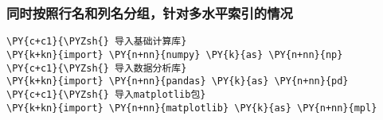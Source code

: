     \hypertarget{ux540cux65f6ux6309ux7167ux884cux540dux548cux5217ux540dux5206ux7ec4ux9488ux5bf9ux591aux6c34ux5e73ux7d22ux5f15ux7684ux60c5ux51b5}{%
\subsubsection{同时按照行名和列名分组，针对多水平索引的情况}\label{ux540cux65f6ux6309ux7167ux884cux540dux548cux5217ux540dux5206ux7ec4ux9488ux5bf9ux591aux6c34ux5e73ux7d22ux5f15ux7684ux60c5ux51b5}}

    \begin{tcolorbox}[breakable, size=fbox, boxrule=1pt, pad at break*=1mm,colback=cellbackground, colframe=cellborder]
\begin{Verbatim}[commandchars=\\\{\}]
\PY{c+c1}{\PYZsh{} 导入基础计算库}
\PY{k+kn}{import} \PY{n+nn}{numpy} \PY{k}{as} \PY{n+nn}{np}
\PY{c+c1}{\PYZsh{} 导入数据分析库}
\PY{k+kn}{import} \PY{n+nn}{pandas} \PY{k}{as} \PY{n+nn}{pd}
\PY{c+c1}{\PYZsh{} 导入matplotlib包}
\PY{k+kn}{import} \PY{n+nn}{matplotlib} \PY{k}{as} \PY{n+nn}{mpl}
\end{Verbatim}
\end{tcolorbox}

